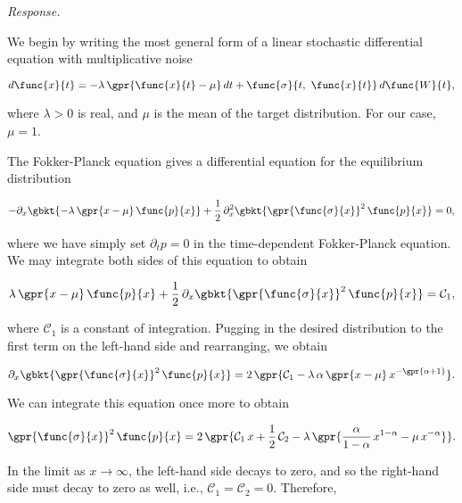\textit{Response.}

We begin by writing the most general form of a linear stochastic differential equation with multiplicative noise

\begin{equation}
	d \func{x}{t} = -\lambda\,\gpr{\func{x}{t} - \mu}\,dt + \func{\sigma}{t,\ \func{x}{t}}\,d \func{W}{t},
\end{equation}

where $\lambda > 0$ is real, and $\mu$ is the mean of the target distribution. For our case, $\mu = 1$.

The Fokker-Planck equation gives a differential equation for the equilibrium distribution

\begin{equation}
	-\partial_{x} \gbkt{-\lambda\,\gpr{x - \mu}\,\func{p}{x}} + \frac{1}{2}\,\partial_x^2 \gbkt{\gpr{\func{\sigma}{x}}^2\,\func{p}{x}} = 0,
\end{equation}

where we have simply set $\partial_t p = 0$ in the time-dependent Fokker-Planck equation. We may integrate both sides of this equation to obtain

\begin{equation}
	\lambda\,\gpr{x - \mu}\,\func{p}{x} + \frac{1}{2}\,\partial_x \gbkt{\gpr{\func{\sigma}{x}}^2\,\func{p}{x}} = \mathcal{C}_1,
\end{equation}

where $\mathcal{C}_1$ is a constant of integration. Pugging in the desired distribution to the first term on the left-hand side and rearranging, we obtain

\begin{equation}
	\partial_x \gbkt{\gpr{\func{\sigma}{x}}^2\,\func{p}{x}} = 2\,\gpr{\mathcal{C}_1 - \lambda\,\alpha\,\gpr{x - \mu}\,x^{-\gpr{\alpha + 1}}}.
\end{equation}

We can integrate this equation once more to obtain

\begin{equation}
	\gpr{\func{\sigma}{x}}^2\,\func{p}{x} = 2\,\gpr{\mathcal{C}_1\,x + \frac{1}{2}\,\mathcal{C}_2 - \lambda\,\gpr{\frac{\alpha}{1 - \alpha}\,x^{1-\alpha} - \mu\,x^{-\alpha}}}.
\end{equation}

In the limit as $x \to \infty$, the left-hand side decays to zero, and so the right-hand side must decay to zero as well, i.e., $\mathcal{C}_1 = \mathcal{C}_2 = 0$. Therefore,


